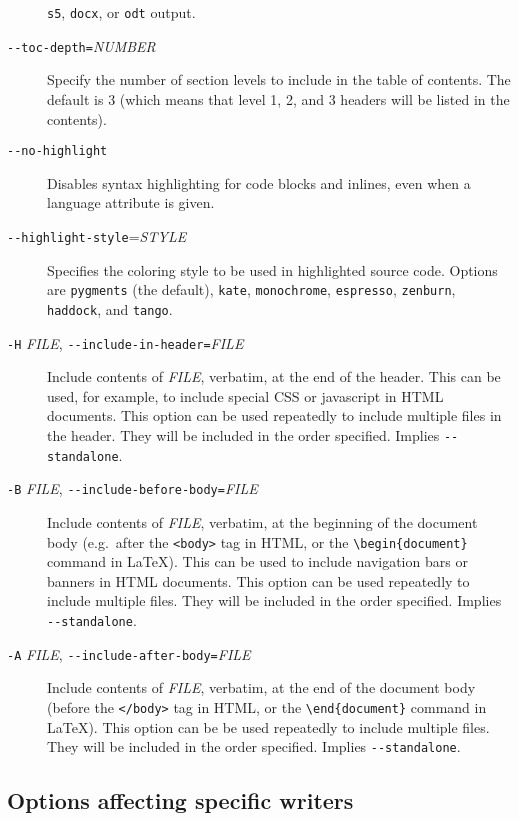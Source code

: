 \documentclass[]{article}
\begin{document}
\begin{description}
\texttt{s5}, \texttt{docx}, or \texttt{odt} output.
\item[\texttt{-{}-toc-depth=}\emph{NUMBER}]
Specify the number of section levels to include in the table of
contents. The default is 3 (which means that level 1, 2, and 3 headers
will be listed in the contents).
\item[\texttt{-{}-no-highlight}]
Disables syntax highlighting for code blocks and inlines, even when a
language attribute is given.
\item[\texttt{-{}-highlight-style}=\emph{STYLE}]
Specifies the coloring style to be used in highlighted source code.
Options are \texttt{pygments} (the default), \texttt{kate},
\texttt{monochrome}, \texttt{espresso}, \texttt{zenburn},
\texttt{haddock}, and \texttt{tango}.
\item[\texttt{-H} \emph{FILE},
\texttt{-{}-include-in-header=}\emph{FILE}]
Include contents of \emph{FILE}, verbatim, at the end of the header.
This can be used, for example, to include special CSS or javascript in
HTML documents. This option can be used repeatedly to include multiple
files in the header. They will be included in the order specified.
Implies \texttt{-{}-standalone}.
\item[\texttt{-B} \emph{FILE},
\texttt{-{}-include-before-body=}\emph{FILE}]
Include contents of \emph{FILE}, verbatim, at the beginning of the
document body (e.g.~after the \texttt{\textless{}body\textgreater{}} tag
in HTML, or the \texttt{\textbackslash{}begin\{document\}} command in
LaTeX). This can be used to include navigation bars or banners in HTML
documents. This option can be used repeatedly to include multiple files.
They will be included in the order specified. Implies
\texttt{-{}-standalone}.
\item[\texttt{-A} \emph{FILE},
\texttt{-{}-include-after-body=}\emph{FILE}]
Include contents of \emph{FILE}, verbatim, at the end of the document
body (before the \texttt{\textless{}/body\textgreater{}} tag in HTML, or
the \texttt{\textbackslash{}end\{document\}} command in LaTeX). This
option can be be used repeatedly to include multiple files. They will be
included in the order specified. Implies \texttt{-{}-standalone}.
\end{description}

\subsection{Options affecting specific writers}
\end{document}
